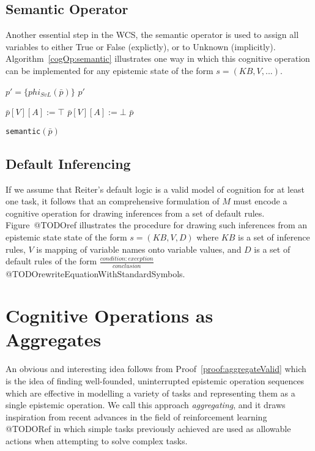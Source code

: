 \subsection{Semantic Operator}

Another essential step in the WCS, the semantic operator is used to assign all variables to either True or False (explictly), or to Unknown (implicitly). Algorithm~\ref{cogOp:semantic} illustrates one way in which this cognitive operation can be implemented for any epistemic state of the form $s=(KB,V,...)$.

\begin{algorithm}[H] \label{cogOp:semantic}
\SetAlgoLined
{}
{
$p'= \{phi_{SvL}(\bar{p})\}$\;
\Return $p'$
}

{
{
{
$\bar{p}[V][A]:=\top$
}
}
{
{
$\bar{p}[V][A]:=\bot$
}
}
\Return $\bar{p}$
}

\caption{\texttt{semantic}$(\bar{p})$}
\end{algorithm}

\subsection{Default Inferencing}
If we assume that Reiter's default logic is a valid model of cognition for at least one task, it follows that an comprehensive formulation of $M$ must encode a cognitive operation for drawing inferences from a set of default rules. Figure~@TODOref illustrates the procedure for drawing such inferences from an epistemic state state of the form $s=(KB,V,D)$ where $KB$ is a set of inference rules, $V$ is mapping of variable names onto variable values, and $D$ is a set of default rules of the form $\frac{condition:exception}{conclusion}$ @TODOrewriteEquationWithStandardSymbols.



\section{Cognitive Operations as Aggregates}
An obvious and interesting idea follows from Proof~\ref{proof:aggregateValid} which is the idea of finding well-founded, uninterrupted epistemic operation sequences which are effective in modelling a variety of tasks and representing them as a single epistemic operation. We call this approach \textit{aggregating}, and it draws inspiration from recent advances in the field of reinforcement learning @TODORef in which simple tasks previously achieved are used as allowable actions when attempting to solve complex tasks.

